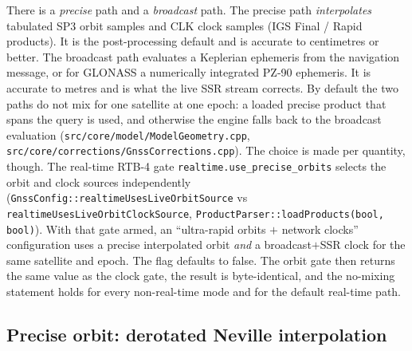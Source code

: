 \documentclass[main.tex]{subfiles}
\begin{document}
There is a \emph{precise} path and a \emph{broadcast} path.  The precise
path \emph{interpolates} tabulated SP3 orbit samples and CLK clock
samples (IGS Final / Rapid products).  It is the post-processing default
and is accurate to centimetres or better.  The broadcast path evaluates
a Keplerian ephemeris from the navigation message, or for GLONASS a
numerically integrated PZ-90 ephemeris.  It is accurate to metres and is
what the live SSR stream corrects.  By default the two paths do not mix
for one satellite at one epoch: a loaded precise product that spans the
query is used, and otherwise the engine falls back to the broadcast
evaluation (\texttt{src/core/model/ModelGeometry.cpp},
\texttt{src/core/corrections/GnssCorrections.cpp}).  The choice is made
per quantity, though.  The real-time RTB-4 gate
\texttt{realtime.use\_precise\_orbits} selects the orbit and clock
sources independently (\texttt{GnssConfig::realtimeUsesLiveOrbitSource}
vs \texttt{realtimeUsesLiveOrbitClockSource},
\texttt{ProductParser::loadProducts(bool,\,bool)}).  With that gate
armed, an ``ultra-rapid orbits $+$ network clocks'' configuration uses a
precise interpolated orbit \emph{and} a broadcast$+$SSR clock for the
same satellite and epoch.  The flag defaults to false.  The orbit gate
then returns the same value as the clock gate, the result is
byte-identical, and the no-mixing statement holds for every
non-real-time mode and for the default real-time path.

\subsection{Precise orbit: derotated Neville interpolation}\label{sec:prod-neville}
\end{document}
